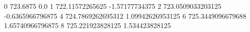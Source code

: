 0 723.6875 0.0
1 722.11572265625 -1.57177734375
2 723.0509033203125 -0.6365966796875
4 724.7869262695312 1.09942626953125
6 725.3449096679688 1.65740966796875
8 725.221923828125 1.534423828125
